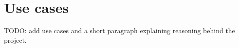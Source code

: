 
\section{Use cases}
TODO: add use cases and a short paragraph explaining reasoning behind the project.